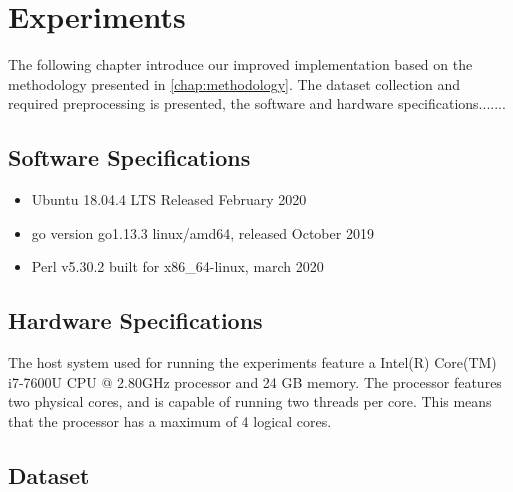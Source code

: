 \chapter{Experiments}
\label{chap:experiments}
The following chapter introduce our improved implementation based on the methodology presented in \cref{chap:methodology}. The dataset collection and required preprocessing is presented, the software and hardware specifications.......

\iffalse
graph the dataset and look at peaks.
Then multiply by potential hosts in enterprise.
Then look at, are we able to handle that amount of events?
What if we use more rules?


The following chapter introduces the actual implementation of the experiment based on the methodology presented in Chapter 4. The collection of the data set, the software versions, the hardware
specifications and the used algorithms during the experiment are presented as well as the experimental design and the technical implementation. It demonstrates the technical execution of the
methodology for reproducibility of the use case.
\fi

\section{Software Specifications}
\label{sec:softwarespecs}

\begin{itemize}
    \item Ubuntu 18.04.4 LTS Released February 2020
    \item go version go1.13.3 linux/amd64, released October 2019
    \item Perl v5.30.2 built for x86\_64-linux, march 2020
\end{itemize}

\section{Hardware Specifications}
\label{sec:hardwarespecs}
The host system used for running the experiments feature a Intel(R) Core(TM) i7-7600U CPU @ 2.80GHz processor and 24 GB memory. The processor features two physical cores, and is capable of running two threads per core. This means that the processor has a maximum of 4 logical cores.

\section{Dataset}



